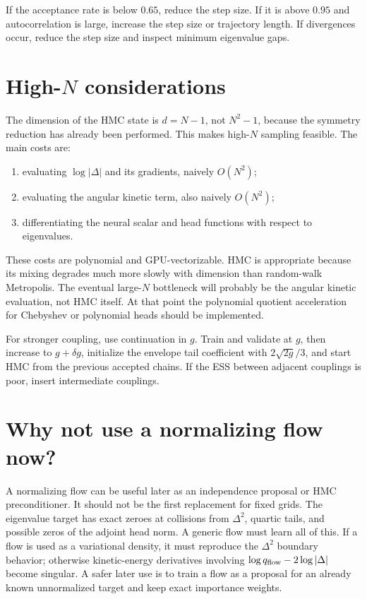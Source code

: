 \documentclass[11pt]{article}
\newcommand{\D}{\Delta}
\begin{document}
If the acceptance rate is below $0.65$, reduce the step size.  If it is above $0.95$ and autocorrelation is large, increase the step size or trajectory length.  If divergences occur, reduce the step size and inspect minimum eigenvalue gaps.

\section{High-$N$ considerations}

The dimension of the HMC state is $d=N-1$, not $N^2-1$, because the symmetry reduction has already been performed.  This makes high-$N$ sampling feasible.  The main costs are:
\begin{enumerate}[label=(\roman*)]
\item evaluating $\log|\D|$ and its gradients, naively $O(N^2)$;
\item evaluating the angular kinetic term, also naively $O(N^2)$;
\item differentiating the neural scalar and head functions with respect to eigenvalues.
\end{enumerate}
These costs are polynomial and GPU-vectorizable.  HMC is appropriate because its mixing degrades much more slowly with dimension than random-walk Metropolis.  The eventual large-$N$ bottleneck will probably be the angular kinetic evaluation, not HMC itself.  At that point the polynomial quotient acceleration for Chebyshev or polynomial heads should be implemented.

For stronger coupling, use continuation in $g$.  Train and validate at $g$, then increase to $g+\delta g$, initialize the envelope tail coefficient with $2\sqrt{2g}/3$, and start HMC from the previous accepted chains.  If the ESS between adjacent couplings is poor, insert intermediate couplings.

\section{Why not use a normalizing flow now?}

A normalizing flow can be useful later as an independence proposal or HMC preconditioner.  It should not be the first replacement for fixed grids.  The eigenvalue target has exact zeroes at collisions from $\D^2$, quartic tails, and possible zeros of the adjoint head norm.  A generic flow must learn all of this.  If a flow is used as a variational density, it must reproduce the $\D^2$ boundary behavior; otherwise kinetic-energy derivatives involving $\log q_{\rm flow}-2\log|\D|$ become singular.  A safer later use is to train a flow as a proposal for an already known unnormalized target and keep exact importance weights.
\end{document}

